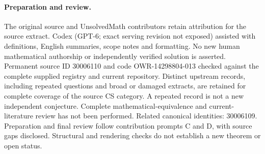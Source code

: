 \documentclass[11pt]{article}
\begin{document}
\paragraph{Preparation and review.}
The original source and UnsolvedMath contributors retain attribution for the source extract. Codex (GPT-6; exact serving revision not exposed) assisted with definitions, English summaries, scope notes and formatting. No new human mathematical authorship or independently verified solution is asserted. Permanent source ID 30006110 and code OWR-14298804-013 checked against the complete supplied registry and current repository. Distinct upstream records, including repeated questions and broad or damaged extracts, are retained for complete coverage of the source CS category. A repeated record is not a new independent conjecture. Complete mathematical-equivalence and current-literature review has not been performed. Related canonical identities: 30006109. Preparation and final review follow contribution prompts C and D, with source gaps disclosed. Structural and rendering checks do not establish a new theorem or open status.
\label{end:30006110}
\end{document}
